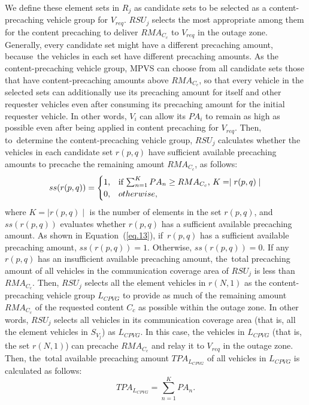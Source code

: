 \documentclass[sensors,aricle,accept,pdftex,moreauthors]{Definitions/mdpi}
\begin{document}
We define these element sets in $R_{j}$ as candidate sets to be selected as a content-precaching vehicle group for $V_{req}$. 
$RSU_{j}$ selects the most appropriate among them for the content precaching to deliver $RMA_{C_{c}}$ to $V_{req}$ in the outage zone.
Generally, every candidate set might have a different precaching amount, because~the vehicles in each set have different precaching amounts.
As the content-precaching vehicle group, MPVS can choose from all candidate sets those that have content-precaching amounts above $RMA_{C_{c}}$, so that every vehicle in the selected sets can additionally use its precaching amount for itself and other requester vehicles even after consuming its precaching amount for the initial requester vehicle.
In other words, $V_{i}$ can allow its $PA_{i}$ to remain as high as possible even after being applied in content precaching for $V_{req}$.
Then, to~determine the content-precaching vehicle group, $RSU_{j}$ calculates whether the vehicles in each candidate set $r(p,q)$ have sufficient available precaching amounts to precache the remaining amount $RMA_{C_{c}}$, as follows:
\begin{equation}
    ss(r(p,q))=\begin{cases}
    $1,$&\text{if $\sum^{K}_{n=1}PA_{n} \geq RMA_{C_{c}}$, $K=\mid r(p,q) \mid$} \\
    $0,$&\text{$otherwise,$}
    \end{cases} \label{eq.13}
\end{equation}
where $K=\mid r(p,q) \mid$ is the number of elements in the set $r(p,q)$, and 
$ss(r(p,q))$ evaluates whether $r(p,q)$ has a sufficient available precaching amount. 
As shown in Equation~(\ref{eq.13}), if~$r(p,q)$ has a sufficient available precaching amount, $ss(r(p,q))=1$. Otherwise, $ss(r(p,q))=0$.
If any $r(p,q)$ has an insufficient available precaching amount, the~total precaching amount of all vehicles in the communication coverage area of $RSU_{j}$ is less than $RMA_{C_{c}}$. 
Then, $RSU_{j}$ selects all the element vehicles in $r(N, 1)$ as the content-precaching vehicle group $L_{CPVG}$ to provide as much of the remaining amount $RMA_{C_{c}}$ of the requested content $C_{c}$ as possible within the outage zone.
In other words, $RSU_{j}$ selects all vehicles in its communication coverage area (that is, all the element vehicles in $S_{V_{j}}$) as  $L_{CPVG}$.
In this case, the vehicles in $L_{CPVG}$ (that is, the set $r(N, 1)$) can precache $RMA_{C_{c}}$ and relay it to $V_{req}$ in the outage zone.
Then, the~total available precaching amount $TPA_{L_{CPVG}}$ of all vehicles in $L_{CPVG}$ is calculated as follows:
\begin{equation}
    TPA_{L_{CPVG}}=\sum^{K}_{n=1}PA_{n}.
\end{equation}
\end{document}
